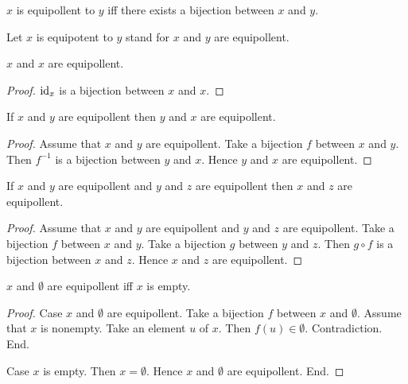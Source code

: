\documentclass[../../set-theory.tex]{subfiles}
\begin{document}
  \begin{forthel}
    \begin{definition}
      $x$ is equipollent to $y$ iff there exists a bijection between $x$ and $y$.
    \end{definition}

    Let $x$ is equipotent to $y$ stand for $x$ and $y$ are equipollent.

    \begin{proposition}\label{SetTheory_02_06_639059}
      $x$ and $x$ are equipollent.
    \end{proposition}
    \begin{proof}
      $\operatorname{id}_{x}$ is a bijection between $x$ and $x$.
    \end{proof}

    \begin{proposition}\label{SetTheory_02_06_467393}
      If $x$ and $y$ are equipollent then $y$ and $x$ are equipollent.
    \end{proposition}
    \begin{proof}
      Assume that $x$ and $y$ are equipollent.
      Take a bijection $f$ between $x$ and $y$.
      Then $f^{-1}$ is a bijection between $y$ and $x$.
      Hence $y$ and $x$ are equipollent.
    \end{proof}

    \begin{proposition}\label{SetTheory_02_06_956273}
      If $x$ and $y$ are equipollent and $y$ and $z$ are equipollent then $x$ and $z$ are equipollent.
    \end{proposition}
    \begin{proof}
      Assume that $x$ and $y$ are equipollent and $y$ and $z$ are equipollent.
      Take a bijection $f$ between $x$ and $y$.
      Take a bijection $g$ between $y$ and $z$.
      Then $g \circ f$ is a bijection between $x$ and $z$.
      Hence $x$ and $z$ are equipollent.
    \end{proof}

    \begin{proposition}\label{SetTheory_02_06_430789}
      $x$ and $\emptyset$ are equipollent iff $x$ is empty.
    \end{proposition}
    \begin{proof}
      Case $x$ and $\emptyset$ are equipollent.
        Take a bijection $f$ between $x$ and $\emptyset$.
        Assume that $x$ is nonempty.
        Take an element $u$ of $x$.
        Then $f(u) \in \emptyset$.
        Contradiction.
      End.

      Case $x$ is empty.
        Then $x = \emptyset$.
        Hence $x$ and $\emptyset$ are equipollent.
      End.
    \end{proof}
  \end{forthel}
\end{document}
